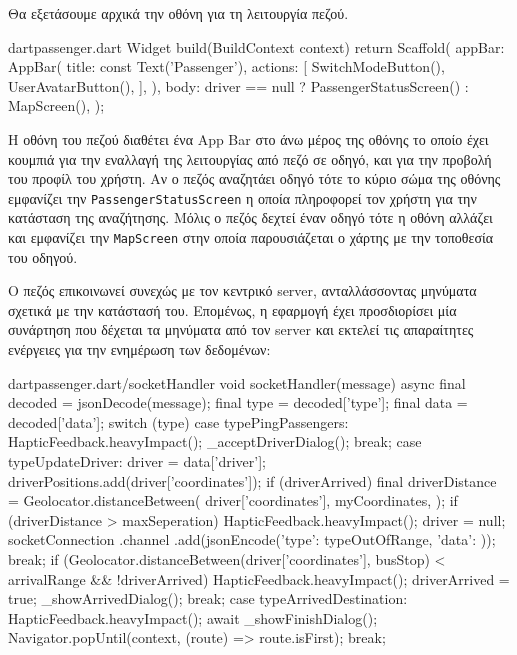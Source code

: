 \documentclass[../thesis.tex]{subfiles}
\begin{document}
Θα εξετάσουμε αρχικά την οθόνη για τη λειτουργία πεζού.

\begin{codeblock}{dart}{passenger.dart}
  Widget build(BuildContext context) {
    return Scaffold(
      appBar: AppBar(
        title: const Text('Passenger'),
        actions: [
          SwitchModeButton(),
          UserAvatarButton(),
        ],
      ),
      body: driver == null
          ? PassengerStatusScreen()
          : MapScreen(),
    );
  }
\end{codeblock}

Η οθόνη του πεζού διαθέτει ένα App Bar στο άνω μέρος της οθόνης το οποίο έχει κουμπιά για την εναλλαγή της λειτουργίας από πεζό σε οδηγό, και για την προβολή του προφίλ του χρήστη.
Αν ο πεζός αναζητάει οδηγό τότε το κύριο σώμα της οθόνης εμφανίζει την \verb|PassengerStatusScreen| η οποία πληροφορεί τον χρήστη για την κατάσταση της αναζήτησης.
Μόλις ο πεζός δεχτεί έναν οδηγό τότε η οθόνη αλλάζει και εμφανίζει την \verb|MapScreen| στην οποία παρουσιάζεται ο χάρτης με την τοποθεσία του οδηγού.

Ο πεζός επικοινωνεί συνεχώς με τον κεντρικό server, ανταλλάσσοντας μηνύματα σχετικά με την κατάστασή του.
Επομένως, η εφαρμογή έχει προσδιορίσει μία συνάρτηση που δέχεται τα μηνύματα από τον server και εκτελεί τις απαραίτητες ενέργειες για την ενημέρωση των δεδομένων:

\begin{codeblock}{dart}{passenger.dart/socketHandler}
  void socketHandler(message) async {
    final decoded = jsonDecode(message);
    final type = decoded['type'];
    final data = decoded['data'];
    switch (type) {
      case typePingPassengers:
        HapticFeedback.heavyImpact();
        _acceptDriverDialog();
        break;
      case typeUpdateDriver:
        driver = data['driver'];
        driverPositions.add(driver['coordinates']);
        if (driverArrived) {
          final driverDistance = Geolocator.distanceBetween(
            driver['coordinates'],
            myCoordinates,
          );
          if (driverDistance > maxSeperation) {
            HapticFeedback.heavyImpact();
            driver = null;
            socketConnection
              .channel
              .add(jsonEncode({'type': typeOutOfRange, 'data': {}}));
            break;
          }
        }
        if (Geolocator.distanceBetween(driver['coordinates'], busStop) < 
        arrivalRange && !driverArrived) {
          HapticFeedback.heavyImpact();
          driverArrived = true;
          _showArrivedDialog();
        }
        break;
      case typeArrivedDestination:
        HapticFeedback.heavyImpact();
        await _showFinishDialog();
        Navigator.popUntil(context, (route) => route.isFirst);
        break;
    }
  }
\end{codeblock}
\end{document}
